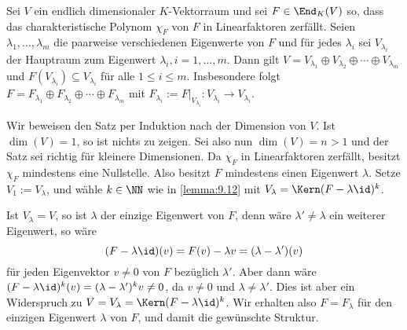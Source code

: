 \begin{satz}
	\label{satz:9.15}
	Sei $V$ ein endlich dimensionaler $K$-Vektorraum und sei $F \in \End_K(V)$ so, dass das charakteristische Polynom $\chi_F$ von $F$ in Linearfaktoren zerfällt.
	Seien $\lambda_1,\dots,\lambda_m$ die paarweise verschiedenen Eigenwerte von $F$ und für jedes $\lambda_i$ sei $V_{\lambda_i}$ der Hauptraum zum Eigenwert $\lambda_i, i = 1, \dots, m$.
	Dann gilt $V = V_{\lambda_1} \oplus V_{\lambda_2} \oplus \cdots \oplus V_{\lambda_m}$ und $F(V_{\lambda_i}) \subseteq V_{\lambda_i}$ für alle $1 \leq i \leq m$.
	Insbesondere folgt $F = F_{\lambda_1} \oplus F_{\lambda_2} \oplus \cdots \oplus F_{\lambda_m}$ mit $F_{\lambda_i} := F\big|_{V_{\lambda_i}} \colon V_{\lambda_i} \rightarrow V_{\lambda_i}$.
\end{satz}

\begin{beweis}
	Wir beweisen den Satz per Induktion nach der Dimension von $V$.
	Ist $\dim(V) = 1$, so ist nichts zu zeigen.
	Sei also nun $\dim(V) = n > 1$ und der Satz sei richtig für kleinere Dimensionen.
	Da $\chi_F$ in Linearfaktoren zerfällt, besitzt $\chi_F$ mindestens eine Nullstelle.
	Also besitzt $F$ mindestens einen Eigenwert $\lambda$.
	Setze $V_1 := V_\lambda$, und wähle $k \in \NN$ wie in \autoref{lemma:9.12} mit $V_\lambda = \Kern(F - \lambda \id)^k$.
	
	Ist $V_\lambda = V$, so ist $\lambda$ der einzige Eigenwert von $F$, denn wäre $\lambda' \neq \lambda$ ein weiterer Eigenwert, so wäre
	\[
		(F-\lambda \id)(v) = F(v) - \lambda v = (\lambda - \lambda')(v)
	\]
	für jeden Eigenvektor $v \neq 0$ von $F$ bezüglich $\lambda'$.
	Aber dann wäre $(F-\lambda \id)^k(v) = (\lambda - \lambda')^kv \neq 0$, da $v \neq 0$ und $\lambda \neq \lambda'$.
	Dies ist aber ein Widerspruch zu $V = V_\lambda = \Kern(F - \lambda \id)^k$.
	Wir erhalten also $F = F_\lambda$ für den einzigen Eigenwert $\lambda$ von $F$, und damit die gewünschte Struktur.
	

\end{beweis}
